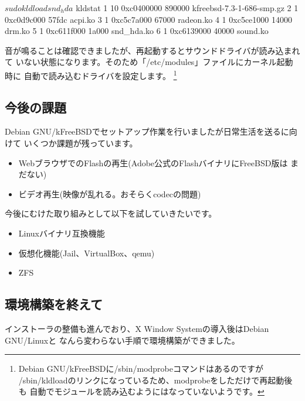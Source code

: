 \documentclass[mingoth,a4paper]{jsarticle}
\begin{document}
\begin{commandline}
$ sudo kldload snd_hda
$ kldstat
 1   10 0xc0400000 890000   kfreebsd-7.3-1-686-smp.gz
 2    1 0xc0d9c000 57fdc    acpi.ko
 3    1 0xc5c7a000 67000    radeon.ko
 4    1 0xc5ce1000 14000    drm.ko
 5    1 0xc611f000 1a000    snd_hda.ko
 6    1 0xc6139000 40000    sound.ko
\end{commandline}

音が鳴ることは確認できましたが、再起動するとサウンドドライバが読み込まれて
いない状態になります。そのため「/etc/modules」ファイルにカーネル起動時に
自動で読み込むドライバを設定します。
\footnote{Debian GNU/kFreeBSDに/sbin/modprobeコマンドはあるのですが
/sbin/kldloadのリンクになっているため、modprobeをしただけで再起動後も
自動でモジュールを読み込むようにはなっていないようです。}


\subsection{今後の課題}
Debian GNU/kFreeBSDでセットアップ作業を行いましたが日常生活を送るに向けて
いくつか課題が残っています。

\begin{itemize}
 \item WebブラウザでのFlashの再生(Adobe公式のFlashバイナリにFreeBSD版は
まだない)
 \item ビデオ再生(映像が乱れる。おそらくcodecの問題)
\end{itemize}

今後にむけた取り組みとして以下を試していきたいです。

\begin{itemize}
 \item Linuxバイナリ互換機能
 \item 仮想化機能(Jail、VirtualBox、qemu)
 \item ZFS
\end{itemize}

\subsection{環境構築を終えて}
インストーラの整備も進んでおり、X Window Systemの導入後はDebian GNU/Linuxと
なんら変わらない手順で環境構築ができました。
\end{document}
